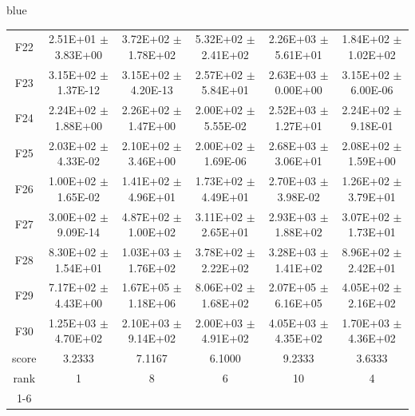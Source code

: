 \documentclass[journal, onecolumn]{IEEEtran}
\begin{document}
\begin{color}{blue}
\begin{table}[htbp!]
\begin{tabular}{c|ccccc}
		F22	 &	2.51E+01	$\pm$	3.83E+00		 &	3.72E+02	$\pm$	1.78E+02		 &	5.32E+02	$\pm$	2.41E+02		 &	2.26E+03	$\pm$	5.61E+01		 &	1.84E+02	$\pm$	1.02E+02	\\	
		F23	 &	3.15E+02	$\pm$	1.37E-12		 &	3.15E+02	$\pm$	4.20E-13		 &	2.57E+02	$\pm$	5.84E+01		 &	2.63E+03	$\pm$	0.00E+00		 &	3.15E+02	$\pm$	6.00E-06	\\	
		F24	 &	2.24E+02	$\pm$	1.88E+00		 &	2.26E+02	$\pm$	1.47E+00		 &	2.00E+02	$\pm$	5.55E-02		 &	2.52E+03	$\pm$	1.27E+01		 &	2.24E+02	$\pm$	9.18E-01	\\	
		F25	 &	2.03E+02	$\pm$	4.33E-02		 &	2.10E+02	$\pm$	3.46E+00		 &	2.00E+02	$\pm$	1.69E-06		 &	2.68E+03	$\pm$	3.06E+01		 &	2.08E+02	$\pm$	1.59E+00	\\	
		F26	 &	1.00E+02	$\pm$	1.65E-02		 &	1.41E+02	$\pm$	4.96E+01		 &	1.73E+02	$\pm$	4.49E+01		 &	2.70E+03	$\pm$	3.98E-02		 &	1.26E+02	$\pm$	3.79E+01	\\	
		F27	 &	3.00E+02	$\pm$	9.09E-14		 &	4.87E+02	$\pm$	1.00E+02		 &	3.11E+02	$\pm$	2.65E+01		 &	2.93E+03	$\pm$	1.88E+02		 &	3.07E+02	$\pm$	1.73E+01	\\	
		F28	 &	8.30E+02	$\pm$	1.54E+01		 &	1.03E+03	$\pm$	1.76E+02		 &	3.78E+02	$\pm$	2.22E+02		 &	3.28E+03	$\pm$	1.41E+02		 &	8.96E+02	$\pm$	2.42E+01	\\	
		F29	 &	7.17E+02	$\pm$	4.43E+00		 &	1.67E+05	$\pm$	1.18E+06		 &	8.06E+02	$\pm$	1.68E+02		 &	2.07E+05	$\pm$	6.16E+05		 &	4.05E+02	$\pm$	2.16E+02	\\	
		F30	 &	1.25E+03	$\pm$	4.70E+02		 &	2.10E+03	$\pm$	9.14E+02		 &	2.00E+03	$\pm$	4.91E+02		 &	4.05E+03	$\pm$	4.35E+02		 &	1.70E+03	$\pm$	4.36E+02	\\	\hline
		score	 	& 3.2333 & 7.1167 & 6.1000 & 9.2333 & 3.6333											\\													
		rank 		& 1 & 8 & 6 & 10 & 4											\\	\cline{1-6}												
										
		\end{tabular}
	\end{table}
	

\end{color}
\end{document}
